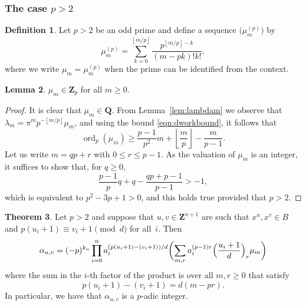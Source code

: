 \documentclass[a4paper,11pt]{article}
\numberwithin{equation}{section}
\providecommand{\floor}[1]{\left\lfloor#1\right\rfloor}   %
\newcommand{\ZZ}{\mathbf{Z}} %
\newcommand{\QQ}{\mathbf{Q}} %
\DeclareMathOperator{\ord}{ord}          %
\theoremstyle{definition}
\newtheorem{thm}{Theorem}[section]
\newtheorem{lem}[thm]{Lemma}
\newtheorem{defn}[thm]{Definition}
\begin{document}
\subsubsection{The case $p > 2$}

\begin{defn} \label{defn:mup}
Let $p >2$ be an odd prime and define a sequence 
$\bigl(\mu_m^{(p)}\bigr)$ by 
\begin{equation*}
\mu_m^{(p)} = \sum_{k=0}^{\floor{m/p}} \frac{p^{\floor{m/p} - k}}{(m-pk)! k!}, 
\end{equation*}
where we write $\mu_m = \mu_m^{(p)}$ when the prime can be identified 
from the context.
\end{defn}

\begin{lem} \label{lem:mup}
$\mu_m \in \ZZ_p$ for all $m \geq 0$.
\end{lem}

\begin{proof}
It is clear that $\mu_m \in \QQ$.  From Lemma~\ref{lem:lambdam} 
we observe that $\lambda_m = \pi^m p^{- \floor{m/p}} \mu_m$, and 
using the bound \eqref{eqn:dworkbound}, it follows that 
\begin{equation*}
\ord_p (\mu_m) \geq \frac{p-1}{p^2} m + \floor{\frac{m}{p}} - \frac{m}{p-1}.
\end{equation*}
Let us write $m = q p + r$ with $0 \leq r \leq p-1$.  As the valuation 
of $\mu_m$ is an integer, it suffices to show that, for $q \geq 0$, 
\begin{equation*}
\frac{p-1}{p} q + q - \frac{q p + p - 1}{p - 1} > -1,
\end{equation*}
which is equivalent to $p^2 - 3p + 1 > 0$, and this holds true 
provided that $p > 2$.
\end{proof}

\begin{thm} \label{thm:alphap}
Let $p > 2$ and suppose that $u, v \in \ZZ^{n+1}$ are such 
that $x^u, x^v \in B$ and 
$p (u_i + 1) \equiv v_i + 1 \pmod{d}$ for all~$i$. Then 
\begin{equation*}
\alpha_{u,v} = (-p)^{k_u} \prod_{i=0}^n 
    a_i^{(p (u_i + 1) - (v_i + 1))/d} \biggl( \sum_{m,r} a_i^{(p-1)r}
    \Bigl(\frac{u_i+1}{d}\Bigr)_r \mu_m \biggr)
\end{equation*}
where the sum in the $i$-th factor of the product is over all $m, r \geq 0$  
that satisfy
\[
p(u_i+1)-(v_i+1)=d(m-pr).
\]
In particular, we have that $\alpha_{u, v}$ is a $p$-adic integer. 
\end{thm}
\end{document}
